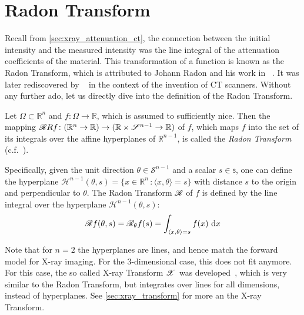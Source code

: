 \section{Radon Transform}\label{sec:radon_transform}

Recall from \autoref{sec:xray_attenuation_ct}, the connection between the initial intensity and the
measured intensity was the line integral of the attenuation coefficients of the material. This
transformation of a function is known as the Radon Transform, which is attributed to Johann Radon
and his work in \citeyear{radon_uber_1917}~\cite{radon_uber_1917,radon_determination_1986}. It was
later rediscovered by \citeauthor{cormack_representation_1963}~\cite{cormack_representation_1963} in
the context of the invention of CT scanners. Without any further ado, let us directly dive into the
definition of the Radon Transform.

\begin{definition}\label{def:radon_transform}
	Let \(\Omega \subset \mathbb{R}^n\) and \(f\colon \Omega \to \mathbb{R}\), which is assumed
	to sufficiently nice. Then the mapping \(\radon{R}f\colon (\mathbb{R}^n \to \mathbb{R})
	\to (\mathbb{R} \times \mathscr{S}^{n-1} \to \mathbb{R})\) of \(f\), which maps \(f\) into
	the set of its integrals over the affine hyperplanes of \(\mathbb{R}^{n-1}\), is called the
	\textit{Radon Transform} (c.f.~\cite{natterer_mathematics_1986,buzug_computed_2008,carpio_inverse_2008}).
\end{definition}

Specifically, given the unit direction \(\theta \in \mathcal{S}^{n-1}\) and a scalar \(s \in
\mathbb{s}\), one can define the hyperplane \(\mathcal{H}^{n-1}(\theta, s) = \lbrace x \in
\mathbb{R}^n \, \colon \langle x, \theta \rangle = s  \rbrace\) with distance \(s\) to the origin
and perpendicular to \(\theta\). The Radon Transform \(\mathscr{R}\) of \(f\) is defined by the line
integral over the hyperplane \(\mathcal{H}^{n-1}(\theta, s)\):
\[ \mathscr{R} f(\theta, s) = \mathscr{R}_\theta f(s) = \int_{\langle x, \theta \rangle = s} f(x) \, \, \mathrm{d}x \]

Note that for \(n=2\) the hyperplanes are lines, and hence match the forward model for X-ray
imaging. For the 3-dimensional case, this does not fit anymore. For this case, the so called X-ray
Transform \(\mathscr{X}\) was developed~\cite{solmon_x-ray_1976}, which is very similar to the Radon
Transform, but integrates over lines for all dimensions, instead of hyperplanes. See
\autoref{sec:xray_transform} for more an the X-ray Transform.

